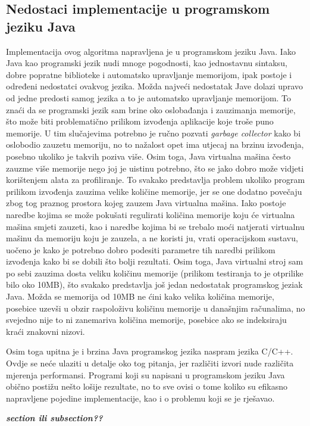 \subsection{Nedostaci implementacije u programskom jeziku Java}
Implementacija ovog algoritma napravljena je u programskom jeziku Java.  Iako Java kao programski jezik nudi mnoge pogodnosti, kao jednostavnu sintaksu, dobre popratne biblioteke i automatsko upravljanje memorijom, ipak postoje i određeni nedostatci ovakvog jezika. Možda najveći nedostatak Jave dolazi upravo od jedne predosti samog jezika a to je automatsko upravljanje memorijom. To znaći da se programski jezik sam brine oko oslobađanja i zauzimanja memorije, što može biti problematično prilikom izvođenja aplikacije koje troše puno memorije. U tim slučajevima potrebno je ručno pozvati \textit{garbage collector} kako bi oslobodio zauzetu memoriju, no to nažalost opet ima utjecaj na brzinu izvođenja, posebno ukoliko je takvih poziva više. Osim toga, Java virtualna mašina često zauzme više memorije nego joj je uistinu potrebno, što se jako dobro može vidjeti korištenjem alata za profiliranje. To svakako predstavlja problem ukoliko program prilikom izvođenja zauzima velike količine memorije, jer se one dodatno povečaju zbog tog praznog prostora kojeg zauzem Java virtualna mašina. Iako postoje naredbe kojima se može pokušati regulirati količina memorije koju će virtualna mašina smjeti zauzeti, kao i naredbe kojima bi se trebalo moći natjerati virtualnu mašinu da memoriju koju je zauzela, a ne koristi ju, vrati operacijskom sustavu, uočeno je kako je potrebno dobro podesiti parametre tih naredbi prilikom izvođenja kako bi se dobili što bolji rezultati. Osim toga, Java virtualni stroj sam po sebi zauzima dosta veliku količinu memorije (prilikom testiranja to je otprilike bilo oko 10MB), što svakako predstavlja još jedan nedostatak programskog jeziak Java. Možda se memorija od 10MB ne ćini kako velika količina memorije, posebice uzevši u obzir raspoloživu količinu memorije u današnjim računalima, no svejedno nije to ni zanemariva količina memorije, posebice ako se indeksiraju kraći znakovni nizovi.

Osim toga upitna je i brzina Java programskog jezika naspram jezika C/C++. Ovdje se neće ulaziti u detalje oko tog pitanja, jer različiti izvori nude različita mjerenja performansi. Programi koji su napisani u programskom jeziku Java obično postižu nešto lošije rezultate, no to sve ovisi o tome koliko su efikasno napravljene pojedine implementacije, kao i o problemu koji se je rješavao.

\emph{\textbf{section ili subsection??}}
